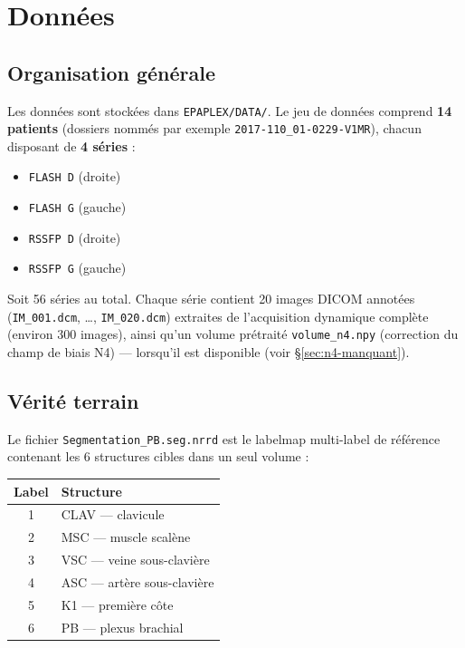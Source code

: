 \chapter{Données}

\section{Organisation générale}

Les données sont stockées dans \texttt{EPAPLEX/DATA/}. Le jeu de données comprend
\textbf{14 patients} (dossiers nommés par exemple \texttt{2017-110\_01-0229-V1MR}), chacun disposant
de \textbf{4 séries} :

\begin{itemize}[nosep]
    \item \texttt{FLASH D} (droite)
    \item \texttt{FLASH G} (gauche)
    \item \texttt{RSSFP D} (droite)
    \item \texttt{RSSFP G} (gauche)
\end{itemize}

Soit 56 séries au total. Chaque série contient 20 images DICOM annotées
(\texttt{IM\_001.dcm}, \ldots, \texttt{IM\_020.dcm}) extraites de l'acquisition dynamique complète
(environ 300 images), ainsi qu'un volume prétraité \texttt{volume\_n4.npy} (correction du champ de
biais N4) --- lorsqu'il est disponible (voir \S\ref{sec:n4-manquant}).

\section{Vérité terrain}

Le fichier \texttt{Segmentation\_PB.seg.nrrd} est le labelmap multi-label de référence contenant les
6 structures cibles dans un seul volume :

\begin{center}
\begin{tabular}{cl}
\toprule
Label & Structure \\
\midrule
1 & CLAV --- clavicule \\
2 & MSC --- muscle scalène \\
3 & VSC --- veine sous-clavière \\
4 & ASC --- artère sous-clavière \\
5 & K1 --- première côte \\
6 & PB --- plexus brachial \\
\bottomrule
\end{tabular}
\end{center}

